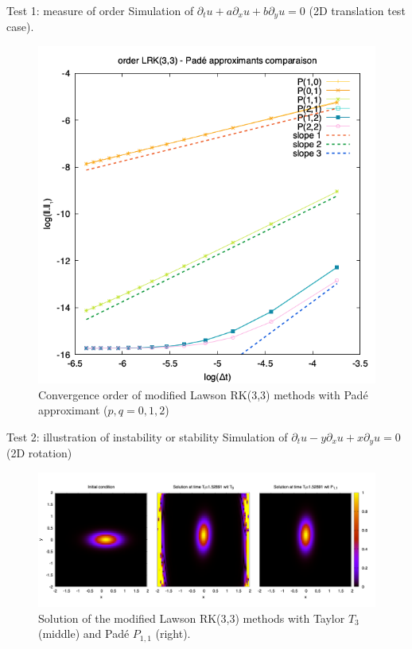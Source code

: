 \documentclass{beamer}
\begin{document}
\begin{frame}{Test 1: measure of order}
  Simulation of $\partial_t u + a\partial_x u + b\partial_y u = 0$ (2D translation test case).
  \begin{figure}
    \centering
    \includegraphics[height=0.6\textheight]{img/order_lrk33pade}
    \caption{Convergence order of modified Lawson RK(3,3) methods with Padé approximant ($p,q=0,1,2$)}
  \end{figure}
\end{frame}
\begin{frame}{Test 2: illustration of instability or stability}
  Simulation of $\partial_t u - y\partial_x u + x\partial_y u = 0$ (2D rotation)
  \begin{figure}
    \centering
    \includegraphics[width=\textwidth]{img/uf_t3p11}
    \caption{Solution of the modified Lawson RK(3,3) methods with Taylor $T_3$ (middle) and Padé $P_{1,1}$ (right).}
  \end{figure}
\end{frame}
\end{document}
